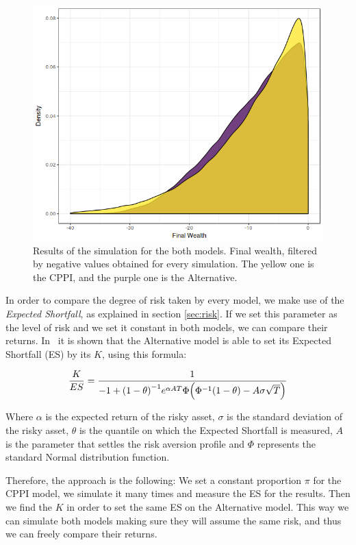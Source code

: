 \begin{figure}[h]
    \centering
    \includegraphics[scale=0.5]{./images/loss_both.png}
    \caption{Results of the simulation for the both models. Final wealth, filtered by negative values obtained for every simulation. The yellow one is the CPPI, and the purple one is the Alternative.}
    \label{fig:loss_both}
\end{figure}

In order to compare the degree of risk taken by every model, we make use of the \textit{Expected Shortfall}, as explained in section \ref{sec:risk}. If we set this parameter as the level of risk and we set it constant in both models, we can compare their returns. In~\cite{a:guillen-optimisation} it is shown that the Alternative model is able to set its Expected Shortfall (ES) by its $K$, using this formula:

\begin{align}\label{eq:kes}
	\frac{K}{ES} = \frac{1}{-1 + \qty(1 - \theta)^{-1} e^{\alpha A T}\Phi\qty(\Phi^{-1}\qty(1 - \theta) - A\sigma\sqrt{T})}
\end{align}

Where $\alpha$ is the expected return of the risky asset, $\sigma$ is the standard deviation of the risky asset, $\theta$ is the quantile on which the Expected Shortfall is measured, $A$ is the parameter that settles the risk aversion profile and $\Phi$ represents the standard Normal distribution function.

Therefore, the approach is the following: We set a constant proportion $\pi$ for the CPPI model, we simulate it many times and measure the ES for the results. Then we find the $K$ in order to set the same ES on the Alternative model. This way we can simulate both models making sure they will assume the same risk, and thus we can freely compare their returns.

